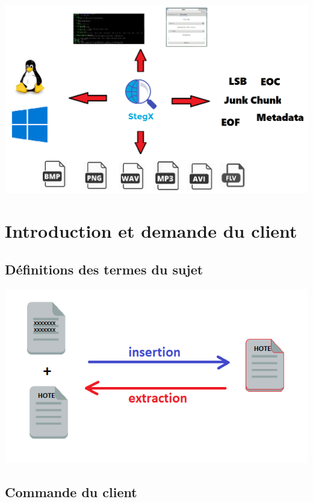 \documentclass{beamer}
\begin{document}
  \begin{frame}
  \includegraphics[scale=0.3]{pictures/bilan_4}
  \end{frame}
  
  \section{Introduction et demande du client}
  
  \subsection{Définitions des termes du sujet}
  
  \begin{frame}
  \hspace{5cm}
  \includegraphics[scale=0.7]{pictures/definition2.png}
  \end{frame}
  
  \subsection{Commande du client}
  
\end{document}
